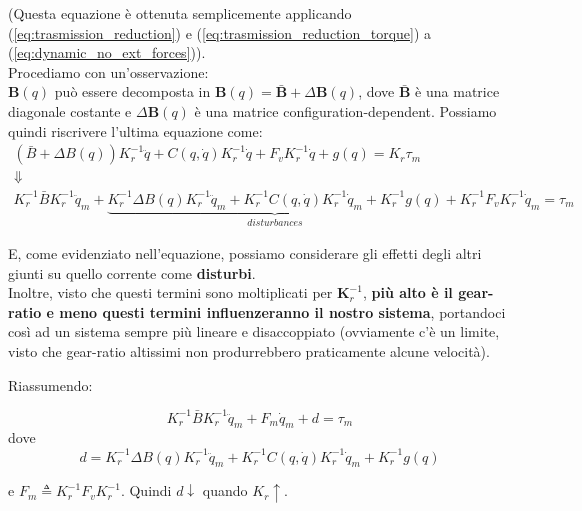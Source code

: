 (Questa equazione è ottenuta semplicemente applicando (\ref{eq:trasmission_reduction}) e (\ref{eq:trasmission_reduction_torque}) a (\ref{eq:dynamic_no_ext_forces})).\\

Procediamo con un'osservazione:\\
$\mathbf{B}(q)$ può essere decomposta in $\mathbf{B}(q) = \bar{\mathbf{B}} + \Delta\mathbf{B}(q)$, dove $\bar{\mathbf{B}}$ è una matrice diagonale costante e $\Delta\mathbf{B}(q)$ è una matrice configuration-dependent. Possiamo quindi riscrivere l'ultima equazione come:
\boldmath
\begin{gather*}
(\bar{B} + \Delta B(q)) K_r^{-1} \ddot{q} + C(q, \dot{q})K_r^{-1}\dot{q} + F_vK_r^{-1}\dot{q} + g(q) = K_r \tau_m \\
\Downarrow \\
K_r^{-1}\bar{B}K_r^{-1}\ddot{q}_m + 
\underbrace{K_r^{-1}\Delta B(q)K_r^{-1}\ddot{q}_m + K_r^{-1}C(q, \dot{q})K_r^{-1}\dot{q}_m + K_r^{-1}g(q)}_{disturbances}
+ K_r^{-1}F_vK_r^{-1}\dot{q}_m  = \tau_m
\end{gather*}
\unboldmath

E, come evidenziato nell'equazione, possiamo considerare gli effetti degli altri giunti su quello corrente come \textbf{disturbi}.\\
Inoltre, visto che questi termini sono moltiplicati per $\mathbf{K}_r^{-1}$, \textbf{più alto è il gear-ratio e meno questi termini influenzeranno il nostro sistema}, portandoci così ad un sistema sempre più lineare e disaccoppiato (ovviamente c'è un limite, visto che gear-ratio altissimi non produrrebbero praticamente alcune velocità).

Riassumendo:

\boldmath
\begin{equation}\label{eq:dynamic_with_disturbances}
K_r^{-1}\bar{B}K_r^{-1}\ddot{q}_m + F_m\dot{q}_m + d = \tau_m
\end{equation}
dove
\begin{equation}\label{eq:dynamic_disturbances}
d = K_r^{-1}\Delta B(q)K_r^{-1}\ddot{q}_m + K_r^{-1}C(q, \dot{q})K_r^{-1}\dot{q}_m + K_r^{-1}g(q)
\end{equation}

e $F_m \triangleq K_r^{-1}F_vK_r^{-1}$. 
Quindi $d \downarrow$ quando $K_r \uparrow$.
\unboldmath



